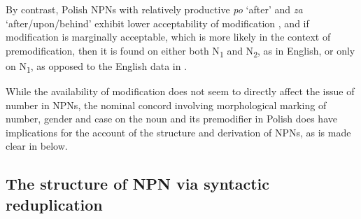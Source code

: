 \documentclass[output=paper]{langscibook}
\begin{document}
\noindent By contrast, Polish NPNs with relatively productive \textit{po} ‘after’ and \textit{za} ‘af\-ter/up\-on/be\-hind’ exhibit lower acceptability of modification , and if modification is marginally acceptable, which is more likely in the context of premodification, then it is found on either both N\textsubscript{1} and N\textsubscript{2}, as in English, or only on N\textsubscript{1}, as opposed to the English data in .

\ea {}\label{psk:ex:key:12}  
\z
\z

\noindent While the availability of modification does not seem to directly affect the issue of number in NPNs, the nominal concord involving morphological marking of number, gender and case on the noun and its premodifier in Polish does have implications for the account of the structure and derivation of NPNs, as is made clear in  below.

\subsection{The structure of NPN via syntactic reduplication}\label{psk:sec:sec-2-4}
\end{document}
